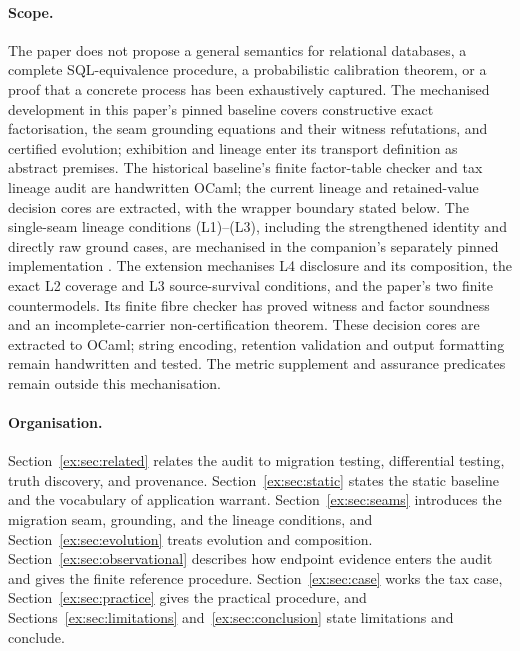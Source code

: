 \documentclass[11pt]{article}
\theoremstyle{definition}
\begin{document}
\paragraph{Scope.} The paper does not propose a general semantics for relational databases, a complete SQL-equivalence procedure, a probabilistic calibration theorem, or a proof that a concrete process has been exhaustively captured. The mechanised development in this paper's pinned baseline covers constructive exact factorisation, the seam grounding equations and their witness refutations, and certified evolution; exhibition and lineage enter its transport definition as abstract premises. The historical baseline's finite factor-table checker and tax lineage audit are handwritten OCaml; the current lineage and retained-value decision cores are extracted, with the wrapper boundary stated below. The single-seam lineage conditions (L1)--(L3), including the strengthened identity and directly raw ground cases, are mechanised in the companion's separately pinned implementation \citep{moore2026transport}. The extension mechanises L4 disclosure and its composition, the exact L2 coverage and L3 source-survival conditions, and the paper's two finite countermodels. Its finite fibre checker has proved witness and factor soundness and an incomplete-carrier non-certification theorem. These decision cores are extracted to OCaml; string encoding, retention validation and output formatting remain handwritten and tested. The metric supplement and assurance predicates remain outside this mechanisation.

\paragraph{Organisation.} Section~\ref{ex:sec:related} relates the audit to migration testing, differential testing, truth discovery, and provenance. Section~\ref{ex:sec:static} states the static baseline and the vocabulary of application warrant. Section~\ref{ex:sec:seams} introduces the migration seam, grounding, and the lineage conditions, and Section~\ref{ex:sec:evolution} treats evolution and composition. Section~\ref{ex:sec:observational} describes how endpoint evidence enters the audit and gives the finite reference procedure. Section~\ref{ex:sec:case} works the tax case, Section~\ref{ex:sec:practice} gives the practical procedure, and Sections~\ref{ex:sec:limitations} and~\ref{ex:sec:conclusion} state limitations and conclude.
\end{document}
